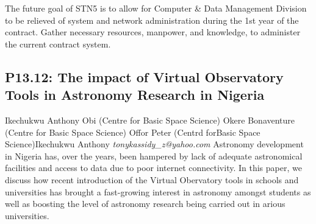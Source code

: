 \documentclass{report}
\begin{document}
The future goal of STN5 is to allow for Computer \& Data Management Division to be relieved of system and network administration during the 1st year of the contract. Gather necessary resources, manpower, and knowledge, to administer the current contract system.\newline
\newpage
\subsection*{P13.12: The impact of Virtual Observatory Tools in Astronomy Research  in Nigeria}
\bigskip
Ikechukwu Anthony Obi (Centre for Basic Space Science) \newline Okere Bonaventure (Centre for Basic Space Science) \newline  Offor Peter (Centrd forBasic Space Science)\newline   \newline  \newline  Ikechukwu Anthony\newline\newline
{\it tonykassidy\_z@yahoo.com}\newline
\newline\newline
Astronomy development in Nigeria has, over the years, been hampered by lack of adequate astronomical facilities and access to data due to poor internet connectivity.
In this paper, we discuss how recent introduction of the Virtual Obervatory tools in schools and universities has brought a fast-growing interest in astronomy amongst students as well as boosting the level of astronomy research being carried out in
 arious universities.\newline
\newpage
\end{document}
